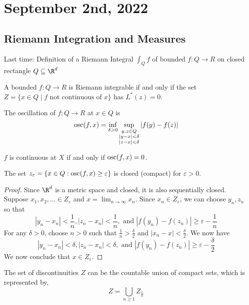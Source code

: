 \section{September 2nd, 2022}

\subsection{Riemann Integration and Measures}
Last time: Definition of a Riemann Integral $\int_Q f$ of bounded $f : Q \to R$ on closed rectangle $Q
\subseteq \R^d$

\begin{theorem}
  A bounded $f : Q \to R$ is Riemann integrable if and only if the set $Z = \{ x \in Q \mid f
  \text{ not continuous of } x \}$ has $L^* (z) = 0$.
\end{theorem}

\begin{definition}[oscillation]
  The oscillation of $f : Q \to R$ at $x \in Q$ is
\[\operatorname*{osc}(f,x) = \inf_{\delta > 0} \sup_{\substack{y, z \in Q \\ | y - x | < \delta \\ |z - x| < \delta}} |f(y) - f(z)| \]
\end{definition}

\begin{lemma}
  $f$ is continuous at $X$ if and only if $\operatorname*{osc} (f,x) = 0$.
\end{lemma}

\begin{lemma}
  The set $z_\varepsilon = \{ x \in Q : \operatorname*{osc}(f,x) \geq \varepsilon \}$ is closed (compact) for $\varepsilon > 0$.
\end{lemma}

\begin{proof}
  Since $\R^d$ is a metric space and closed, it is also sequentially closed.
  Suppose $x_1, x_2, \ldots \in Z_\varepsilon$ and $x = \lim_{n \to \infty} x_n$.
  Since $x_n \in Z_\varepsilon$, we can choose $y_n, z_n$ so that
  \[|y_n - x_n| < \frac{1}{n}, |z_n - x_n| < \frac{1}{n}, \text{ and } |f(y_n) - f(z_n)| \geq \varepsilon - \frac{1}{n}\]
  For any $\delta > 0$, choose $n > 0$ such that $\frac{1}{n} > \frac{\delta}{2}$ and $|x_n - x| < \frac{\delta}{2}$.
  We now have
  \[|y_n - x_n| < \delta, |z_n - x_n| < \delta, \text{ and } |f(y_n) - f(z_n)| \geq \varepsilon - \frac{\delta}{2}\]
  We now conclude that $x \in Z_\varepsilon$.
\end{proof}

\begin{notation}
The set of discontinuities $Z$ can be the countable union of compact sets, which is represented by,
\[ Z = \bigcup_{n \geq 1} Z_{\frac{1}{n}} \]
\end{notation}

